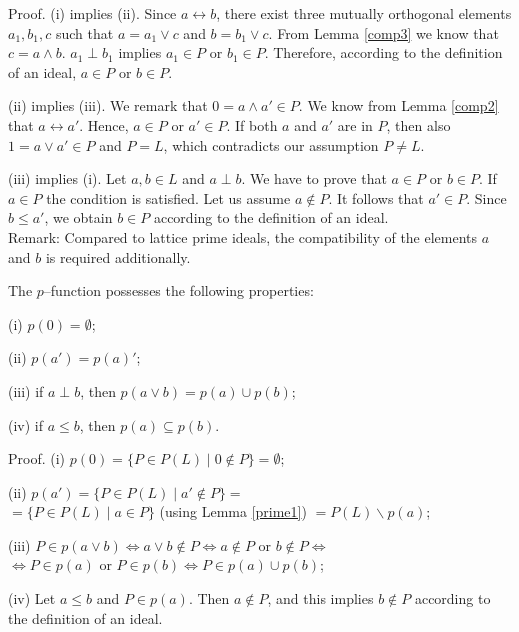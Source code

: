 Proof.
(i) implies (ii).
Since $a \leftrightarrow b$, there exist three mutually orthogonal elements
$a_1, b_1, c$ such that $a = a_1 \vee c$ and $b = b_1 \vee c$.
From Lemma \ref{comp3} we know that $c = a \wedge b$.
$a_1 \perp b_1$ implies $a_1 \in P$ or $b_1 \in P$.
Therefore, according to the definition of an ideal, $a \in P$ or $b \in P$.

(ii) implies (iii).
We remark that $0 = a \wedge a' \in P$.
We know from Lemma \ref{comp2} that $a \leftrightarrow a'$.
Hence, $a \in P$ or $a' \in P$.
If both $a$ and $a'$ are in $P$, then also $1 = a \vee a' \in P$ and
$P = L$, which contradicts our assumption $P \neq L$.

(iii) implies (i).
Let $a,b \in L$ and $a \perp b$.
We have to prove that $a \in P$ or $b \in P$.
If $a \in P$ the condition is satisfied.
Let us assume $a \not\in P$.
It follows that $a' \in P$.
Since $b \le a'$, we obtain $b \in P$ according to the definition of an ideal.\\

Remark: Compared to lattice prime ideals, the compatibility
of the elements $a$ and $b$ is required additionally.

\begin{lemma}
\label{p-function}
The $p$--function possesses the following properties:

(i) $p(0) = \emptyset$;

(ii) $p(a') = p(a)'$;

(iii) if $a \perp b$, then $p(a \vee b) = p(a) \cup p(b)$;

(iv) if $a \le b$, then $p(a) \subseteq p(b)$.
\end{lemma}

Proof.
(i) $p(0) = \{P \in P(L)\mid 0 \not\in P \} = \emptyset$;

(ii) $p(a') = \{P \in P(L)\mid a' \not\in P\} =$  \\
\hspace*{12mm}
$= \{P \in P(L)\mid a\in P\}$ (using Lemma \ref{prime1})
$= P(L) \backslash p(a)$;

(iii) $P \in p(a \vee b) \Leftrightarrow a \vee b \not\in P
\Leftrightarrow a \not\in P \mbox{ or } b \not\in P
\Leftrightarrow $\\
\hspace*{12mm}
$\Leftrightarrow P \in p(a) \mbox{ or } P \in p(b)
\Leftrightarrow P \in p(a) \cup p(b)$;

(iv) Let $a \le b$ and $P \in p(a)$.
Then $a \not\in P$, and this implies $b \not\in P$
according to the definition of an ideal.


